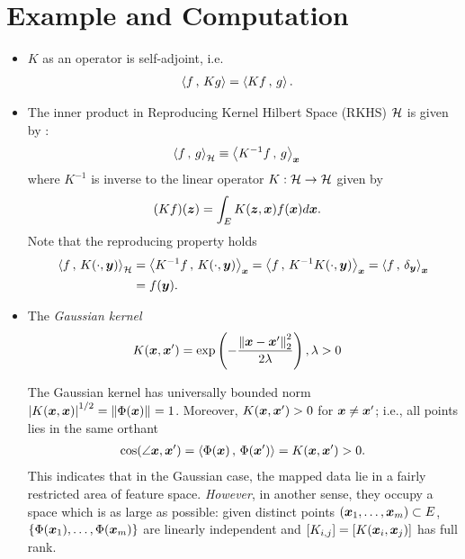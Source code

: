 \documentclass[11pt]{article}
\begin{document}
\section{Example and Computation}
\begin{itemize}
\item $K$ as an operator is self-adjoint, i.e. 
\begin{align*}
\left\langle f\,,\, Kg \right\rangle &= \left\langle Kf\,,\, g \right\rangle.
\end{align*}


\item The inner product in Reproducing Kernel Hilbert Space (RKHS) ${\mathcal H}$ is given by  \citep{ramm1998theory}:
\begin{align}
\left\langle f\,,\, g \right\rangle_{{\mathcal H}} &\equiv \left\langle K^{-1}f\,,\, g \right\rangle_{\boldsymbol{x}} \label{expr: RKHS_inn}
\end{align} 
where $K^{-1}$ is inverse to the linear operator $K: {\mathcal H} \rightarrow {\mathcal H}$ given by
\begin{align*}
(Kf)(\boldsymbol{z}) &= \int_{E}K(\boldsymbol{z},\boldsymbol{x})f(\boldsymbol{x}) d\boldsymbol{x}. 
\end{align*}
Note that the reproducing property holds
\begin{align*}
\left\langle f\,,\, K(\cdot, \boldsymbol{y}) \right\rangle_{{\mathcal H}} &=\left\langle K^{-1}f\,,\, K(\cdot, \boldsymbol{y}) \right\rangle_{\boldsymbol{x}}=  \left\langle f\,,\, K^{-1}K(\cdot, \boldsymbol{y}) \right\rangle_{\boldsymbol{x}} = \left\langle f\,,\, \delta_{\boldsymbol{y}} \right\rangle_{\boldsymbol{x}}\\
&= f(\boldsymbol{y}).
\end{align*}

\item The \emph{Gaussian kernel} 
\begin{align}
K(\boldsymbol{x}, \boldsymbol{x}') &= \exp\left(-\frac{\left\|\boldsymbol{x} - \boldsymbol{x}'\right\|_{2}^{2}}{2\lambda}\right), \lambda>0 \label{eqn: Gaussian_Kernel}
\end{align}

The  Gaussian kernel has universally bounded norm $\left\lvert K(\boldsymbol{x} , \boldsymbol{x} ) \right\rvert^{1/2}= \left\|\Phi(\boldsymbol{x})\right\|_{} = 1$. Moreover, $K(\boldsymbol{x}, \boldsymbol{x}')>0$ for $\boldsymbol{x} \neq \boldsymbol{x}'$; i.e., all points lies in the same orthant 
\begin{align*}
\cos(\angle \boldsymbol{x}, \boldsymbol{x}') = \left\langle \Phi(\boldsymbol{x})\,,\, \Phi(\boldsymbol{x}') \right\rangle = K(\boldsymbol{x}, \boldsymbol{x}')>0.
\end{align*} This indicates that in the Gaussian case, the mapped data lie in a fairly restricted area of feature space. \emph{However}, in another sense, they occupy a space which is as large as possible: given distinct points $(\boldsymbol{x}_{1}, \ldots, \boldsymbol{x}_{m})\subset E$, $\left\{\Phi(\boldsymbol{x}_{1}),\ldots, \Phi(\boldsymbol{x}_{m}) \right\}$ are linearly independent and $[K_{i,j}] = [K(\boldsymbol{x}_{i},  \boldsymbol{x}_{j})]$ has full rank. 
 

\end{itemize}
\end{document}
